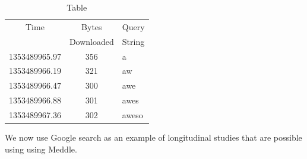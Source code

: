 

\begin{table}
\begin{center}
\begin{tabular}{|c|c|l|}
\hline
Time & Bytes & Query \tabularnewline
 & Downloaded & String\tabularnewline
\hline 
1353489965.97 & 356 & a \tabularnewline
\hline
1353489966.19& 321 & aw\tabularnewline
\hline
1353489966.47& 300 & awe\tabularnewline
\hline
1353489966.88& 301 & awes\tabularnewline
\hline
1353489967.36& 302 & aweso\tabularnewline
\hline
\end{tabular}
\end{center}
\caption{Table}
\label{tab:ExampleGoogleSearch}
\end{table}
We now use Google search as an example of longitudinal studies that
are possible using using Meddle.


